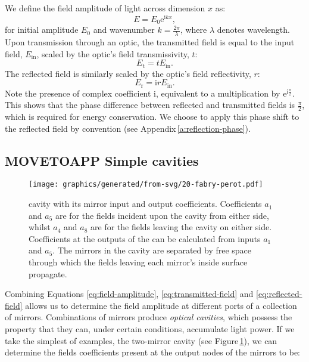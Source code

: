 We define the field amplitude of light across dimension $x$ as:
\begin{equation}
  \label{eq:field-amplitude}
  E = E_0 \text{e}^{\text{i} kx},
\end{equation}
for initial amplitude $E_0$ and wavenumber $k = \frac{2 \pi}{\lambda}$, where $\lambda$ denotes wavelength. Upon transmission through an optic, the transmitted field is equal to the input field, $E_{\text{in}}$, scaled by the optic's field transmissivity, $t$:
\begin{equation}
  \label{eq:transmitted-field}
  E_{\text{t}} = tE_{\text{in}}.
\end{equation}
The reflected field is similarly scaled by the optic's field reflectivity, $r$:
\begin{equation}
  \label{eq:reflected-field}
  E_{\text{r}} = \text{i}rE_{\text{in}}.
\end{equation}
Note the presence of complex coefficient $\text{i}$, equivalent to a multiplication by $\text{e}^{\text{i} \frac{\pi}{2}}$. This shows that the phase difference between reflected and transmitted fields is $\frac{\pi}{2}$, which is required for energy conservation. We choose to apply this phase shift to the reflected field by convention (see Appendix\,\ref{a:reflection-phase}).

\subsection{MOVETOAPP Simple cavities}

\begin{figure}
  \centering
  \texttt{[image: graphics/generated/from-svg/20-fabry-perot.pdf]}
  \caption{\label{fig:fabry-perot}\FP{} cavity with its mirror input and output coefficients. Coefficients $a_1$ and $a_5$ are for the fields incident upon the cavity from either side, whilst $a_4$ and $a_8$ are for the fields leaving the cavity on either side. Coefficients at the outputs of the \FP{} can be calculated from inputs $a_1$ and $a_5$. The mirrors in the cavity are separated by free space through which the fields leaving each mirror's inside surface propagate.}
\end{figure}

Combining Equations \ref{eq:field-amplitude}, \ref{eq:transmitted-field} and \ref{eq:reflected-field} allows us to determine the field amplitude at different ports of a collection of mirrors. Combinations of mirrors produce \emph{optical cavities}, which possess the property that they can, under certain conditions, accumulate light power. If we take the simplest of examples, the two-mirror \FP{} cavity (see Figure\,\ref{fig:fabry-perot}), we can determine the fields coefficients present at the output nodes of the mirrors to be:

